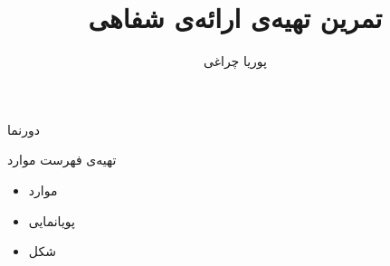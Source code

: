 \documentclass{beamer}
\title{تمرین تهیه‌ی ارائه‌ی شفاهی}
\author{پوریا چراغی}
\begin{document}
\maketitle
\begin{frame}{دورنما}
\tableofcontents
\end{frame}
\begin{frame}{تهیه‌ی فهرست موارد}
\begin{itemize}
\item موارد \pause
\item پویانمایی \pause
\item شکل  \pause
\end{itemize}
\end{frame}
\end{document}
